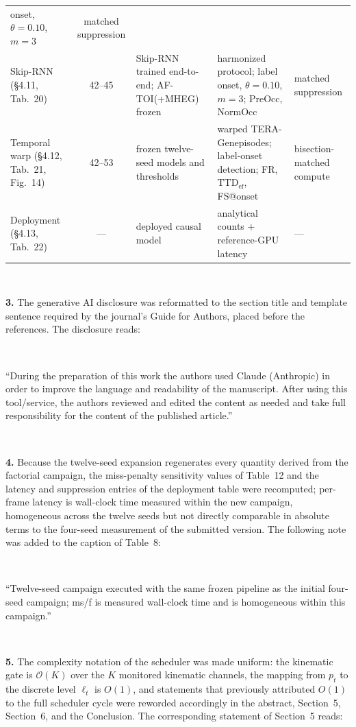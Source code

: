 \documentclass[1p,12pt,authoryear]{elsarticle}
\providecommand{\TERAGen}{\mbox{TERA-Gen}}
\providecommand{\MHEG}{MHEG}
\begin{document}
\begin{table}[!tbp]
\begin{tabularx}{\textwidth}{>{\raggedright\arraybackslash}p{2.7cm}
  c >{\raggedright\arraybackslash}p{3.0cm} >{\raggedright\arraybackslash}X
  >{\raggedright\arraybackslash}p{2.4cm}}
  onset, $\theta{=}0.10$, $m{=}3$ & matched suppression \\
Skip-RNN (\S4.11, Tab.~20) & 42--45
  & Skip-RNN trained end-to-end; \mbox{AF-TOI}(+\MHEG) frozen
  & harmonized protocol; label onset, $\theta{=}0.10$, $m{=}3$; PreOcc,
    NormOcc & matched suppression \\
Temporal warp (\S4.12, Tab.~21,
Fig.~14) & 42--53 & frozen twelve-seed models and thresholds
  & warped \TERAGen episodes; label-onset detection; FR,
    $\mathrm{TTD}_{\mathrm{ef}}$, FS@onset & bisection-matched compute \\
Deployment (\S4.13, Tab.~22) & ---
  & deployed causal model & analytical counts + reference-GPU latency & --- \\
\bottomrule
\end{tabularx}
\end{table}

~

\noindent \textbf{3.} The generative AI disclosure was reformatted to the section title and template sentence required by the journal's Guide for Authors, placed before the references. The disclosure reads:

~

``During the preparation of this work the authors used Claude (Anthropic) in order to improve the language and readability of the manuscript. After using this tool/service, the authors reviewed and edited the content as needed and take full responsibility for the content of the published article.''

~

\noindent \textbf{4.} Because the twelve-seed expansion regenerates every quantity derived from the factorial campaign, the miss-penalty sensitivity values of Table~12 and the latency and suppression entries of the deployment table were recomputed; per-frame latency is wall-clock time measured within the new campaign, homogeneous across the twelve seeds but not directly comparable in absolute terms to the four-seed measurement of the submitted version. The following note was added to the caption of Table~8:

~

``Twelve-seed campaign executed with the same frozen pipeline as the initial four-seed campaign; ms/f is measured wall-clock time and is homogeneous within this campaign.''

~

\noindent \textbf{5.} The complexity notation of the scheduler was made uniform: the kinematic gate is $\mathcal{O}(K)$ over the $K$ monitored kinematic channels, the mapping from $p_t$ to the discrete level $\ell_t$ is $O(1)$, and statements that previously attributed $O(1)$ to the full scheduler cycle were reworded accordingly in the abstract, Section~5, Section~6, and the Conclusion. The corresponding statement of Section~5 reads:
\end{document}

